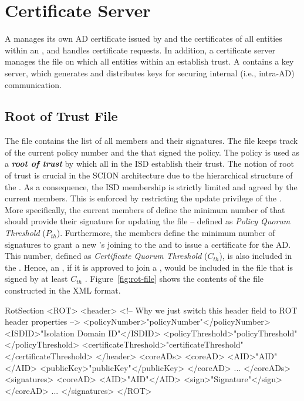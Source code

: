\section{Certificate Server}
A \CS manages its own AD certificate issued by \ISDC and the
certificates of all entities within an \AD, and handles certificate
requests. In addition, a \ISDC certificate server manages the \RT file
on which all entities within an \ISD establish {trust}. A \CS contains
a key server, which generates and distributes keys for securing
internal (i.e., intra-AD) communication.

\subsection{Root of Trust File} \label{subsec:root-of-trust}
The \RT file contains the list of all \ISDC members and their
signatures. The file keeps track of the current policy number and the
\ADs that signed the policy. The policy is used as a {\bf \em root of
trust} by which all \ADs in the ISD establish their trust. The notion
of root of trust is crucial in the SCION architecture due to the
hierarchical structure of the \ISD. As a consequence, the ISD
membership is strictly limited and agreed by the current members.
This is enforced by restricting the update privilege of the \PF. More
specifically, the current members of \ISDC define the minimum number
of \ADs that should provide their signature for updating the \RT file
-- defined as {\em Policy Quorum Threshold} ($P_{th}$). Furthermore,
the \ISDC members define the minimum number of \AD signatures to grant
a new \AD's joining to the \ISDC and to issue a certificate for the
AD. This number, defined as {\em Certificate Quorum Threshold}
($C_{th}$), is also included in the \PF. Hence, an \AD, if it is
approved to join a \ISDC, would be included in the \RT file that is
signed by at least $C_{th}$ \ISDC \ADs. Figure~\ref{fig:rot-file}
shows the contents of the \RT file constructed in the XML format.

\begin{SaveVerbatim}{RotSection}
<ROT>
	<header> 
	<!-- Why we just switch this header field to ROT header properties -->
		<policyNumber>"policyNumber"</policyNumber>
		<ISDID>"Isolation Domain ID"</ISDID>
		<policyThreshold>"policyThreshold"</policyThreshold>
		<certificateThreshold>"certificateThreshold"</certificateThreshold>
	</header>
	<coreADs>
		<coreAD>
			<AID>"AID"</AID>
			<publicKey>"publicKey"</publicKey>
		</coreAD>
		...
	</coreADs>
	<signatures>
		<coreAD>
			<AID>"AID"</AID>
			<sign>"Signature"</sign>
		</coreAD>
		...
	</signatures>
</ROT>
\end{SaveVerbatim}

